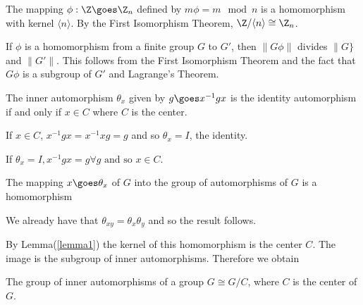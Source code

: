 \begin{theorem}
The mapping $\phi: \Z\goes\Z_n$ defined by $m\phi = m\mod n$ is a homomorphism with kernel $\langle n \rangle$. By the 
First Isomorphism Theorem, $\Z/\langle n\rangle \cong \Z_n$. 
\end{theorem}

If $\phi$ is a homomorphism from a finite group $G$ to $G'$, then $\|G\phi\|$ divides $\|G\}$ and $\|G'\|$. This follows from 
the First Isomorphism Theorem and the fact that $G\phi$ is a subgroup of $G'$ and Lagrange's Theorem. 

\begin{lemma}
The inner automorphism $\theta_x$ given by $g \goes x^{-1} g x$ is the identity automorphism if and only if $x\in C$ where $C$ is the center. 
\label{lemma1}\end{lemma}
If $x\in C$, $x^{-1} g x = x^{-1} x g = g$ and so $\theta_x = I$, the identity. 

If $\theta_x = I, x^{-1} g x = g \forall g \mbox{   and so  } x\in C$.

\begin{lemma}
The mapping $x \goes \theta_x$ of $G$ into the group of automorphisms of $G$ is a homomorphism
\end{lemma}
We already have that $\theta_{xy} = \theta_x\theta_y$ and so the result follows. 

By Lemma(\ref{lemma1}) the kernel of this homomorphism is the center $C$. The image is the subgroup of inner automorphisms. Therefore we obtain
\begin{theorem}
The group of inner automorphisms of a group $G \cong G/C$, where $C$ is the center of $G$.
\end{theorem}